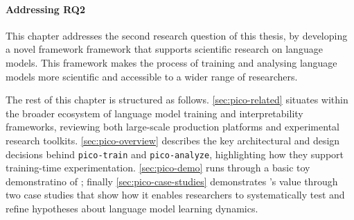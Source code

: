 \paragraph{Addressing RQ2} This chapter addresses the second research question of this thesis, by developing a novel framework framework that supports scientific research on language models. This framework makes the process of training and analysing language models more scientific and accessible to a wider range of researchers.

\vspace{1em}

The rest of this chapter is structured as follows. \cref{sec:pico-related} situates \pico within the broader ecosystem of language model training and interpretability frameworks, reviewing both large-scale production platforms and experimental research toolkits. \cref{sec:pico-overview} describes the key architectural and design decisions behind \texttt{pico-train} and \texttt{pico-analyze}, highlighting how they support training-time experimentation. \cref{sec:pico-demo} runs through a basic toy demonstratino of \pico; finally \cref{sec:pico-case-studies} demonstrates \pico's value through two case studies that show how it enables researchers to systematically test and refine hypotheses about language model learning dynamics.

